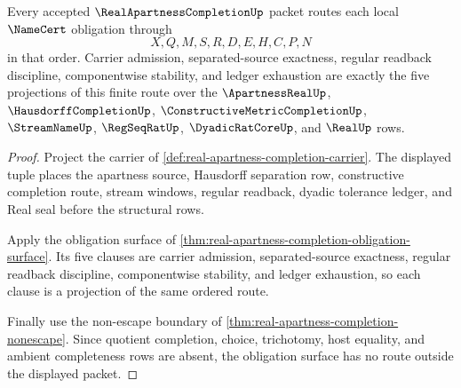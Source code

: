 \begin{theorem}
\label{thm:real-apartness-completion-obligation-routing}
Every accepted $\RealApartnessCompletionUp$ packet routes each local $\NameCert$ obligation through
$$
X,Q,M,S,R,D,E,H,C,P,N
$$
in that order. Carrier admission, separated-source exactness, regular readback discipline, componentwise stability, and ledger exhaustion are exactly the five projections of this finite route over the $\ApartnessRealUp$, $\HausdorffCompletionUp$, $\ConstructiveMetricCompletionUp$, $\StreamNameUp$, $\RegSeqRatUp$, $\DyadicRatCoreUp$, and $\RealUp$ rows.
\end{theorem}
\begin{proof}
Project the carrier of \autoref{def:real-apartness-completion-carrier}. The displayed tuple places the apartness source, Hausdorff separation row, constructive completion route, stream windows, regular readback, dyadic tolerance ledger, and Real seal before the structural rows.

Apply the obligation surface of \autoref{thm:real-apartness-completion-obligation-surface}. Its five clauses are carrier admission, separated-source exactness, regular readback discipline, componentwise stability, and ledger exhaustion, so each clause is a projection of the same ordered route.

Finally use the non-escape boundary of \autoref{thm:real-apartness-completion-nonescape}. Since quotient completion, choice, trichotomy, host equality, and ambient completeness rows are absent, the obligation surface has no route outside the displayed packet.
\end{proof}


